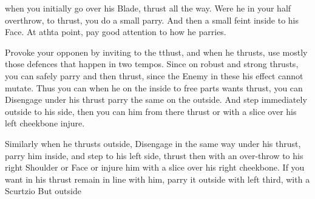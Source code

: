 \newpage


\newpage


when you initially go over his Blade, thrust all the way. Were he in your half overthrow, to thrust, you do a small parry. And then a small feint inside to his Face. At athta point, pay good attention to how he parries.


Provoke your opponen by inviting to the tthust, and when he thrusts, use mostly those defences that happen in two tempos. Since on robust and strong thrusts, you can safely parry and then thrust, since the Enemy in these his effect cannot mutate. Thus you can when he on the inside to free parts wants thrust, you can Disengage under his thrust parry the same on the outside. And step immediately outside to his side, then you can him from there thrust or with a slice over his left cheekbone injure.

\exercise{}

Similarly when he thrusts outside, Disengage in the same way under his thrust, parry him inside, and step to his left side, thrust then with an over-throw to his right Shoulder or Face or injure him with a slice over his right cheekbone. If you want in his thrust remain in line with him, parry it outside with left third, with a Scurtzio But outside

